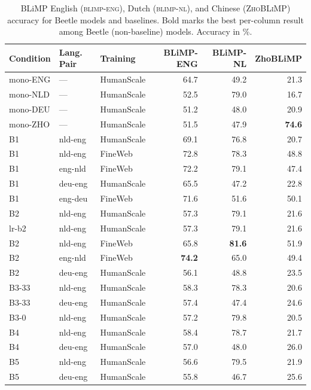 \begin{table}[t]
  \centering
  \small
  \caption{BLiMP English (\textsc{blimp-eng}), Dutch (\textsc{blimp-nl}),
           and Chinese (\textsc{ZhoBLiMP}) accuracy for Beetle models and baselines.
           Bold marks the best per-column result among Beetle (non-baseline) models.
           Accuracy in \%.}
  \label{tab:blimp_main}
  \begin{tabular}{lllrrr}
    \toprule
    Condition & Lang.\,Pair & Training & BLiMP-ENG & BLiMP-NL & ZhoBLiMP \\
    \midrule
    mono-ENG & --- & HumanScale & 64.7 & 49.2 & 21.3 \\
    mono-NLD & --- & HumanScale & 52.5 & 79.0 & 16.7 \\
    mono-DEU & --- & HumanScale & 51.2 & 48.0 & 20.9 \\
    mono-ZHO & --- & HumanScale & 51.5 & 47.9 & \textbf{74.6} \\
    B1 & nld-eng & HumanScale & 69.1 & 76.8 & 20.7 \\
    B1 & nld-eng & FineWeb & 72.8 & 78.3 & 48.8 \\
    B1 & eng-nld & FineWeb & 72.2 & 79.1 & 47.4 \\
    B1 & deu-eng & HumanScale & 65.5 & 47.2 & 22.8 \\
    B1 & eng-deu & FineWeb & 71.6 & 51.6 & 50.1 \\
    B2 & nld-eng & HumanScale & 57.3 & 79.1 & 21.6 \\
    lr-b2 & nld-eng & HumanScale & 57.3 & 79.1 & 21.6 \\
    B2 & nld-eng & FineWeb & 65.8 & \textbf{81.6} & 51.9 \\
    B2 & eng-nld & FineWeb & \textbf{74.2} & 65.0 & 49.4 \\
    B2 & deu-eng & HumanScale & 56.1 & 48.8 & 23.5 \\
    B3-33 & nld-eng & HumanScale & 58.3 & 78.3 & 20.6 \\
    B3-33 & deu-eng & HumanScale & 57.4 & 47.4 & 24.6 \\
    B3-0 & nld-eng & HumanScale & 57.2 & 79.8 & 20.5 \\
    B4 & nld-eng & HumanScale & 58.4 & 78.7 & 21.7 \\
    B4 & deu-eng & HumanScale & 57.0 & 48.0 & 26.0 \\
    B5 & nld-eng & HumanScale & 56.6 & 79.5 & 21.9 \\
    B5 & deu-eng & HumanScale & 55.8 & 46.7 & 25.6 \\

\end{tabular}
\end{table}
